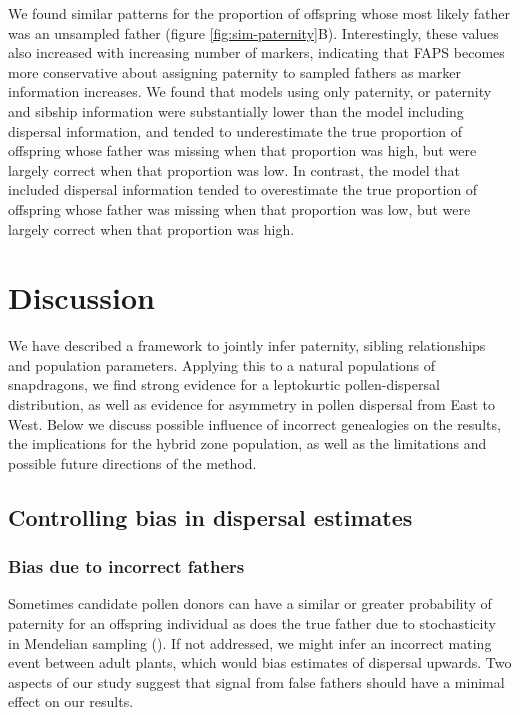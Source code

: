 \documentclass[10pt, a4paper, twocolumn]{article} %
\begin{document}
We found similar patterns for the proportion of offspring whose most likely father was an unsampled father (figure \ref{fig:sim-paternity}B).
Interestingly, these values also increased with increasing number of markers, indicating that FAPS becomes more conservative about assigning paternity to sampled fathers as marker information increases.
We found that models using only paternity, or paternity and sibship information were substantially lower than the model including dispersal information, and tended to underestimate the true proportion of offspring whose father was missing when that proportion was high, but were largely correct when that proportion was low.
In contrast, the model that included dispersal information tended to overestimate the true proportion of offspring whose father was missing when that proportion was low, but were largely correct when that proportion was high.

\subsection{}

\section{Discussion}

We have described a framework to jointly infer paternity, sibling relationships and population parameters. 
Applying this to a natural populations of snapdragons, we find strong evidence for a leptokurtic pollen-dispersal distribution, as well as evidence for asymmetry in pollen dispersal from East to West.
Below we discuss possible influence of incorrect genealogies on the results, the implications for the hybrid zone population, as well as the limitations and possible future directions of the method.

\subsection{Controlling bias in dispersal estimates}

\subsubsection{Bias due to incorrect fathers}

Sometimes candidate pollen donors can have a similar or greater probability of paternity for an offspring individual as does the true father due to stochasticity in Mendelian sampling (\cite{thompson1976paradox}).
If not addressed, we might infer an incorrect mating event between adult plants, which would bias estimates of dispersal upwards.
Two aspects of our study suggest that signal from false fathers should have a minimal effect on our results.
\end{document}
